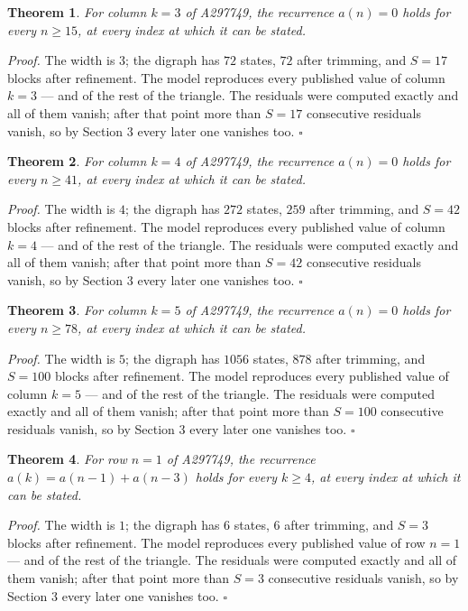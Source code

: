 \documentclass[11pt]{article}
\newtheorem{theorem}{Theorem}
\theoremstyle{definition}
\begin{document}
\begin{theorem} For column $k = 3$ of A297749, the recurrence $a(n) = 0$ holds for every $n \ge 15$, at every index at which it can be stated.\end{theorem}

{\itshape Proof.} The width is $3$; the digraph has $72$ states, $72$ after trimming, and $S = 17$ blocks after refinement. The model reproduces every published value of column $k = 3$ --- and of the rest of the triangle. The residuals were computed exactly and all of them vanish; after that point more than $S = 17$ consecutive residuals vanish, so by Section 3 every later one vanishes too. $\square$

\begin{theorem} For column $k = 4$ of A297749, the recurrence $a(n) = 0$ holds for every $n \ge 41$, at every index at which it can be stated.\end{theorem}

{\itshape Proof.} The width is $4$; the digraph has $272$ states, $259$ after trimming, and $S = 42$ blocks after refinement. The model reproduces every published value of column $k = 4$ --- and of the rest of the triangle. The residuals were computed exactly and all of them vanish; after that point more than $S = 42$ consecutive residuals vanish, so by Section 3 every later one vanishes too. $\square$

\begin{theorem} For column $k = 5$ of A297749, the recurrence $a(n) = 0$ holds for every $n \ge 78$, at every index at which it can be stated.\end{theorem}

{\itshape Proof.} The width is $5$; the digraph has $1056$ states, $878$ after trimming, and $S = 100$ blocks after refinement. The model reproduces every published value of column $k = 5$ --- and of the rest of the triangle. The residuals were computed exactly and all of them vanish; after that point more than $S = 100$ consecutive residuals vanish, so by Section 3 every later one vanishes too. $\square$

\begin{theorem} For row $n = 1$ of A297749, the recurrence $a(k) = a(n-1) + a(n-3)$ holds for every $k \ge 4$, at every index at which it can be stated.\end{theorem}

{\itshape Proof.} The width is $1$; the digraph has $6$ states, $6$ after trimming, and $S = 3$ blocks after refinement. The model reproduces every published value of row $n = 1$ --- and of the rest of the triangle. The residuals were computed exactly and all of them vanish; after that point more than $S = 3$ consecutive residuals vanish, so by Section 3 every later one vanishes too. $\square$
\end{document}
